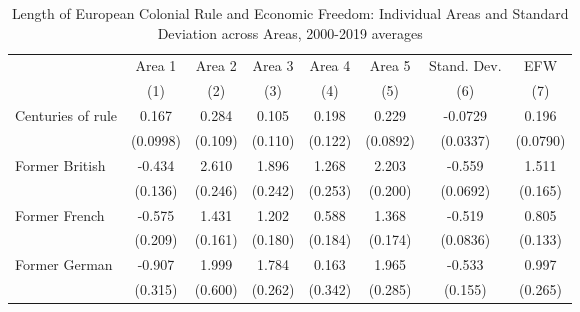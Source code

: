 \begin{sidewaystable}[h!]
\begin{threeparttable}
\begin{center}
\begin{minipage}{\textwidth}
\small
\caption{Length of European Colonial Rule and Economic Freedom: Individual Areas and Standard Deviation across Areas, 2000-2019 averages}
\label{tab:TabB2}
\begin{tabular*}{\textwidth}{@{\extracolsep{\fill}}lccccccc@{\extracolsep{\fill}}}
\hline\hline
            &\multicolumn{1}{c}{Area 1}&\multicolumn{1}{c}{Area 2}&\multicolumn{1}{c}{Area 3}&\multicolumn{1}{c}{Area 4}&\multicolumn{1}{c}{Area 5}&\multicolumn{1}{c}{Stand. Dev.}&\multicolumn{1}{c}{EFW}\\
            &\multicolumn{1}{c}{(1)}&\multicolumn{1}{c}{(2)}&\multicolumn{1}{c}{(3)}&\multicolumn{1}{c}{(4)}&\multicolumn{1}{c}{(5)}&\multicolumn{1}{c}{(6)}&\multicolumn{1}{c}{(7)}\\
\hline
Centuries of rule &       0.167\sym{*}  &       0.284\sym{**} &       0.105         &       0.198         &       0.229\sym{**} &     -0.0729\sym{**} &       0.196\sym{**} \\
            &    (0.0998)         &     (0.109)         &     (0.110)         &     (0.122)         &    (0.0892)         &    (0.0337)         &    (0.0790)         \\
[0.125em]
Former British &      -0.434\sym{***}&       2.610\sym{***}&       1.896\sym{***}&       1.268\sym{***}&       2.203\sym{***}&      -0.559\sym{***}&       1.511\sym{***}\\
            &     (0.136)         &     (0.246)         &     (0.242)         &     (0.253)         &     (0.200)         &    (0.0692)         &     (0.165)         \\
[0.125em]
Former French &      -0.575\sym{***}&       1.431\sym{***}&       1.202\sym{***}&       0.588\sym{***}&       1.368\sym{***}&      -0.519\sym{***}&       0.805\sym{***}\\
            &     (0.209)         &     (0.161)         &     (0.180)         &     (0.184)         &     (0.174)         &    (0.0836)         &     (0.133)         \\
[0.125em]
Former German &      -0.907\sym{***}&       1.999\sym{***}&       1.784\sym{***}&       0.163         &       1.965\sym{***}&      -0.533\sym{***}&       0.997\sym{***}\\
            &     (0.315)         &     (0.600)         &     (0.262)         &     (0.342)         &     (0.285)         &     (0.155)         &     (0.265)         \\

\end{tabular*}
\end{minipage}
\end{center}
\end{threeparttable}
\end{sidewaystable}
